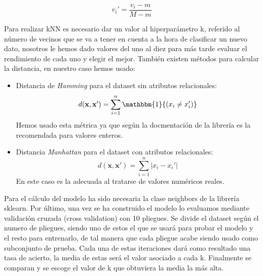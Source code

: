 \documentclass[conference,a4paper]{IEEEtran}
\begin{document}
\begin{equation}
v_{i}' = \frac{v_{i} - m}{M - m}
\end{equation}

Para realizar kNN es necesario dar un valor al hiperparámetro k, referido al número de vecinos que se va a tener en cuenta a la hora de clasificar un nuevo dato, nosotros le hemos dado valores del uno al diez para más tarde evaluar el rendimiento de cada uno y elegir el mejor. También existen métodos para calcular la distancia, en nuestro caso hemos usado:
\begin{itemize}
\item Distancia de \emph{Hamming} para el dataset sin atributos relacionales:
\begin{equation}
d(\textbf{x},\textbf{x}') = \sum_{i=1}^n \mathbbm{1}{(x_{i}\neq{x_{i}'})}
\end{equation}
Hemos usado esta métrica ya que según la docmentación de la librería \cite{b2} es la recomendada para valores enteros.
\\
\item Distancia \emph{Manhattan} para el dataset con atributos relacionales:
\begin{equation}
d(\textbf{x},\textbf{x}') = \sum_{i=1}^n |x_{i} - x_{i}'|
\end{equation}
En este caso es la adecuada al tratarse de valores numéricos reales.
\end{itemize}

Para el cálculo del modelo ha sido necesaria la clase neighbors de la librería sklearn.
Por último, una vez se ha construido el modelo lo evaluamos mediante validación cruzada (cross validation) con 10 pliegues. Se divide el dataset según el numero de pliegues, siendo uno de estos el que se usará para probar el modelo y el resto para entrenarlo, de tal manera que cada pliegue acabe siendo usado como subconjunto de prueba. Cada una de estas iteraciones dará como resultado una tasa de acierto, la media de estas será el valor asociado a cada k. Finalmente se comparan y se escoge el valor de k que obtuviera la media la más alta.
\end{document}
